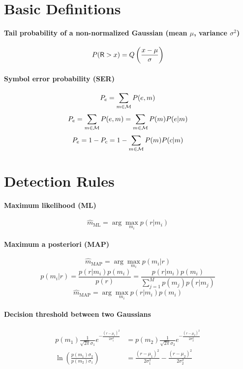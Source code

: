 \section*{Basic Definitions}

\paragraph{Tail probability of a non-normalized Gaussian (mean $\mu$, variance $\sigma^2$)}
\[
P({\mathsf R} > x) = Q\left( \frac{x - \mu}{\sigma}\right)
\]

\paragraph{Symbol error probability (SER)}
\[
P_e = \sum_{m \in {\cal M}} P(e,m)
\]
\begin{equation}
P_e = \sum_{m \in {\cal M}} P(e,m) = \sum_{m \in {\cal M}} P(m) P(e|m)
\label{eq:pe}
\end{equation}
\[
P_e = 1 - P_c = 1 - \sum_{m \in {\cal M}} P(m) P(c|m)
\]

\section*{Detection Rules}

\paragraph{Maximum likelihood (ML)}
\[
\hat m_{\textrm{ML}} = \arg \max_{m_i} p(r|m_i)
\]

\paragraph{Maximum a posteriori (MAP)}
\begin{equation}
\hat m_{\textrm{MAP}} = \arg \max_{m_i} p(m_i|r)
\label{eq:map0}
\end{equation}
\begin{equation*}
p(m_i|r) = \frac{p(r|m_i)p(m_i)}{p(r)} = \frac{p(r|m_i)p(m_i)}{\sum_{j=1}^M p(m_j)p(r|m_j)}
\label{eq:bayestheorem}
\end{equation*}
\begin{equation}
\hat m_{\textrm{MAP}} = \arg \max_{m_i} p(r|m_i)p(m_i)
\label{eq:map}
\end{equation}

\paragraph{Decision threshold between two Gaussians}
\begin{align*}
p(m_1) \frac{1}{\sqrt{2 \pi} \sigma_1} e^{- \frac{(r-\mu_1)^2}{2 \sigma_1^2} } &= p(m_2) \frac{1}{\sqrt{2 \pi} \sigma_2} e^{- \frac{(r-\mu_2)^2}{2 \sigma_2^2} } \\
\ln \left( \frac{p(m_1) \sigma_2}{p(m_2) \sigma_1} \right)&=\frac{(r-\mu_1)^2}{2 \sigma_1^2}  -\frac{(r-\mu_2)^2}{2 \sigma_2^2}
\end{align*}

